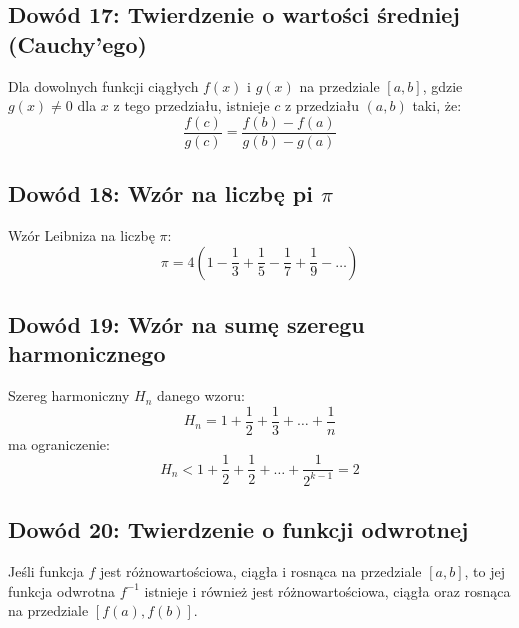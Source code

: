 \documentclass{article}
\begin{document}
\subsection*{Dowód 17: Twierdzenie o wartości średniej (Cauchy'ego)}

Dla dowolnych funkcji ciągłych \(f(x)\) i \(g(x)\) na przedziale \([a, b]\), gdzie \(g(x) \neq 0\) dla \(x\) z tego przedziału, istnieje \(c\) z przedziału \((a, b)\) taki, że:
\[ \frac{f(c)}{g(c)} = \frac{f(b) - f(a)}{g(b) - g(a)} \]

\subsection*{Dowód 18: Wzór na liczbę pi \(\pi\)}

Wzór Leibniza na liczbę \(\pi\):
\[ \pi = 4 \left(1 - \frac{1}{3} + \frac{1}{5} - \frac{1}{7} + \frac{1}{9} - \ldots \right) \]

\subsection*{Dowód 19: Wzór na sumę szeregu harmonicznego}

Szereg harmoniczny \(H_n\) danego wzoru:
\[ H_n = 1 + \frac{1}{2} + \frac{1}{3} + \ldots + \frac{1}{n} \]
ma ograniczenie:
\[ H_n < 1 + \frac{1}{2} + \frac{1}{2} + \ldots + \frac{1}{2^{k-1}} = 2 \]

\subsection*{Dowód 20: Twierdzenie o funkcji odwrotnej}

Jeśli funkcja \(f\) jest różnowartościowa, ciągła i rosnąca na przedziale \([a, b]\), to jej funkcja odwrotna \(f^{-1}\) istnieje i również jest różnowartościowa, ciągła oraz rosnąca na przedziale \([f(a), f(b)]\).
\end{document}
